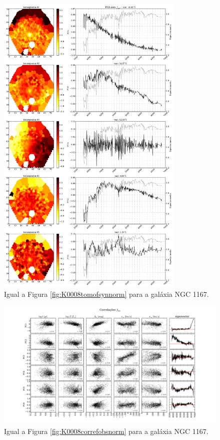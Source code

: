 \begin{figure}
    \includegraphics[width=0.8\textwidth]{figuras/K0119-tomo-syn-norm.pdf}
    \caption[Tomogramas de 1 a 5 para o cubo $f_{syn}$ - NGC 1167.]
    {Igual a Figura \ref{fig:K0008tomofsynnorm} para a galáxia NGC 1167.}
    \label{fig:K0119tomofsynnorm}
\end{figure}

\begin{figure}
    \includegraphics[width=1.3\textwidth, angle=-90]{figuras/K0119-correl-f_obs_norm-PCvsPhys.pdf}
	\caption[Correlações PCs vs. par\^ametros f\'isicos - $f_{obs}$ - NGC 1167.]
	{Igual a Figura \ref{fig:K0008correfobsnorm} para a galáxia NGC 1167.}
    \label{fig:K0119correfobsnorm}
\end{figure}

